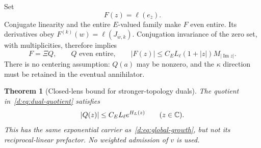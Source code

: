 \documentclass[11pt,a4paper]{article}
\numberwithin{equation}{section}
\newtheorem{theorem}{Theorem}[section]
\theoremstyle{definition}\newtheorem{definition}[theorem]{Definition}
\theoremstyle{remark}\newtheorem{remark}[theorem]{Remark}
\begin{document}
Set
\begin{equation}\label{d:eq:dual-entire}
 F(z)=\ell(e_{\overline z}).
\end{equation}
Conjugate linearity and the entire $E$-valued family make $F$ even entire. Its derivatives obey
$F^{(k)}(w)=\ell(J_{\overline w,k})$.
Conjugation invariance of the zero set, with multiplicities, therefore implies
\begin{equation}\label{d:eq:dual-quotient}
 F=\Xi Q,\qquad Q\text{ even entire},\qquad
 |F(z)|\le C_E L_\ell(1+|z|)M_{|\operatorname{Im}z|}.
\end{equation}
There is no centering assumption: $Q(a)$ may be nonzero, and the $\kappa$ direction must be retained in the eventual annihilator.

\begin{theorem}[Closed-lens bound for stronger-topology duals]\label{d:thm:dual-lens}
The quotient in~\eqref{d:eq:dual-quotient} satisfies
\begin{equation}\label{d:eq:dual-lens}
 |Q(z)|\le C_E L_\ell e^{H_L(z)}\qquad(z\in\mathbb C).
\end{equation}
This has the same exponential carrier as~\eqref{d:eq:global-growth}, but not its reciprocal-linear prefactor. No weighted admission of $v$ is used.
\end{theorem}
\end{document}
